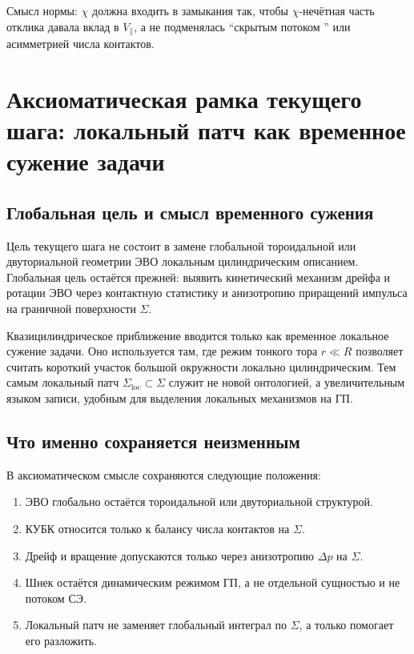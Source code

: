 \begin{remark}
Смысл нормы: \(\chi\) должна входить в замыкания так, чтобы \(\chi\)-нечётная часть отклика давала вклад в \(V_{\parallel}\),
а не подменялась ``скрытым потоком \SE'' или асимметрией числа контактов.
\end{remark}

\section{Аксиоматическая рамка текущего шага: локальный патч как временное сужение задачи}
\label{sec:a_current_step}

\subsection{Глобальная цель и смысл временного сужения}

Цель текущего шага не состоит в замене глобальной тороидальной или двуториальной
геометрии ЭВО локальным цилиндрическим описанием.
Глобальная цель остаётся прежней:
выявить кинетический механизм дрейфа и ротации ЭВО через контактную статистику
и анизотропию приращений импульса на граничной поверхности $\Sigma$.

Квазицилиндрическое приближение вводится только как временное локальное сужение задачи.
Оно используется там, где режим тонкого тора $r \ll R$ позволяет считать короткий участок
большой окружности локально цилиндрическим.
Тем самым локальный патч $\Sigma_{\mathrm{loc}} \subset \Sigma$
служит не новой онтологией, а увеличительным языком записи,
удобным для выделения локальных механизмов на ГП.

\subsection{Что именно сохраняется неизменным}

В аксиоматическом смысле сохраняются следующие положения:

\begin{enumerate}
\item ЭВО глобально остаётся тороидальной или двуториальной структурой.
\item КУБК относится только к балансу числа контактов на $\Sigma$.
\item Дрейф и вращение допускаются только через анизотропию $\Delta p$ на $\Sigma$.
\item Шнек остаётся динамическим режимом ГП, а не отдельной сущностью и не потоком СЭ.
\item Локальный патч не заменяет глобальный интеграл по $\Sigma$, а только помогает его разложить.
\end{enumerate}


